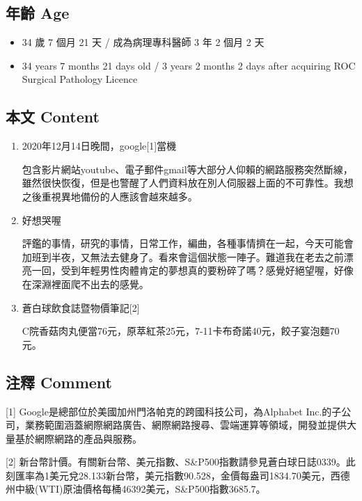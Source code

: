 \documentclass[
]{article}
\providecommand{\tightlist}{%
  \setlength{\itemsep}{0pt}\setlength{\parskip}{0pt}}
\begin{document}
\hypertarget{ux5e74ux9f61-age-13}{%
\subsection{年齡 Age}\label{ux5e74ux9f61-age-13}}

\begin{itemize}
\tightlist
\item
  34 歲 7 個月 21 天 / 成為病理專科醫師 3 年 2 個月 2 天
\item
  34 years 7 months 21 days old / 3 years 2 months 2 days after
  acquiring ROC Surgical Pathology Licence
\end{itemize}

\hypertarget{ux672cux6587-content-13}{%
\subsection{本文 Content}\label{ux672cux6587-content-13}}

\begin{enumerate}
\def\labelenumi{\arabic{enumi}.}
\item
  2020年12月14日晚間，google{[}1{]}當機

  包含影片網站youtube、電子郵件gmail等大部分人仰賴的網路服務突然斷線，雖然很快恢復，但是也警醒了人們資料放在別人伺服器上面的不可靠性。我想之後重視異地備份的人應該會越來越多。
\item
  好想哭喔

  評鑑的事情，研究的事情，日常工作，編曲，各種事情擠在一起，今天可能會加班到半夜，又無法去健身了。看來會這個狀態一陣子。難道我在老去之前漂亮一回，受到年輕男性肉體肯定的夢想真的要粉碎了嗎？感覺好絕望喔，好像在深淵裡面爬不出去的感覺。
\item
  蒼白球飲食誌暨物價筆記{[}2{]}

  C院香菇肉丸便當76元，原萃紅茶25元，7-11卡布奇諾40元，餃子宴泡麵70元。
\end{enumerate}

\hypertarget{ux6ce8ux91cb-comment-13}{%
\subsection{注釋 Comment}\label{ux6ce8ux91cb-comment-13}}

{[}1{]} Google是總部位於美國加州門洛帕克的跨國科技公司，為Alphabet
Inc.的子公司，業務範圍涵蓋網際網路廣告、網際網路搜尋、雲端運算等領域，開發並提供大量基於網際網路的產品與服務。

{[}2{]}
新台幣計價。有關新台幣、美元指數、S\&P500指數請參見蒼白球日誌0339。此刻匯率為1美元兌28.133新台幣，美元指數90.528，金價每盎司1834.70美元，西德州中級(WTI)原油價格每桶46392美元，S\&P500指數3685.7。
\end{document}
